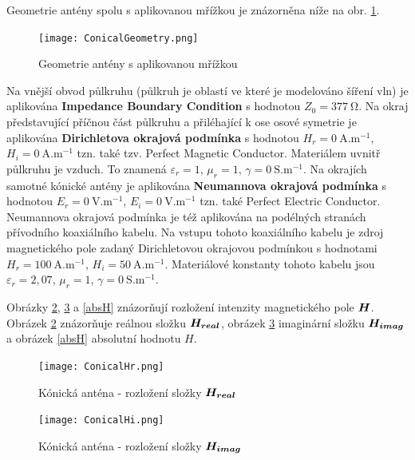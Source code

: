 \documentclass[12pt,a4paper,oneside]{article}
\numberwithin{equation}{section} %
\numberwithin{figure}{section} %
\numberwithin{table}{section} %
\renewcommand{\vec}[1]{\mbox{\boldmath$#1$}} %
\begin{document}
Geometrie antény spolu s aplikovanou mřížkou je znázorněna níže na obr. \ref{meshed}. 

\begin{figure}
\begin{center}
\texttt{[image: ConicalGeometry.png]} 
\caption{Geometrie antény s aplikovanou mřížkou} 
\label{meshed}
\end{center}
\end{figure}

Na vnější obvod půlkruhu (půlkruh je oblastí ve které je modelováno šíření vln) je aplikována \textbf{Impedance Boundary Condition} s hodnotou $Z_0 = 377 ~ \mathrm{\Omega}$. Na okraj představující příčnou část půlkruhu a přiléhající k ose osové symetrie je aplikována \textbf{Dirichletova okrajová podmínka} s hodnotou $H_r = 0 ~ \mathrm{A.m^{-1}}$, $H_i = 0 ~ \mathrm{A.m^{-1}}$ tzn. také tzv. Perfect Magnetic Conductor. Materiálem uvnitř půlkruhu je vzduch. To znamená $\varepsilon _r = 1$, $\mu _r = 1$, $\gamma = 0 ~ \mathrm{S.m^{-1}}$. Na okrajích samotné kónické antény je aplikována \textbf{Neumannova okrajová podmínka} s hodnotou $E_r = 0 ~ \mathrm{V.m^{-1}}$, $E_i = 0 ~ \mathrm{V.m^{-1}}$ tzn. také Perfect Electric Conductor. Neumannova okrajová podmínka je též aplikována na podélných stranách přívodního koaxiálního kabelu. Na vstupu tohoto koaxiálního kabelu je zdroj magnetického pole zadaný Dirichletovou okrajovou podmínkou s hodnotami $H_r = 100 ~ \mathrm{A.m^{-1}}$, $H_i = 50 ~ \mathrm{A.m^{-1}}$. Materiálové konstanty tohoto kabelu jsou $\varepsilon _r = 2,07$, $\mu _r = 1$, $\gamma = 0 ~ \mathrm{S.m^{-1}}$.

Obrázky \ref{Hreal}, \ref{Himag} a \ref{absH} znázorňují rozložení intenzity magnetického pole $\vec{H}$. Obrázek \ref{Hreal} znázorňuje reálnou složku $\vec{H _{real}}$, obrázek \ref{Himag} imaginární složku $\vec{H _{imag}}$ a obrázek \ref{absH} absolutní hodnotu $H$.

\begin{figure}
\begin{center}
\texttt{[image: ConicalHr.png]} 
\caption{Kónická anténa - rozložení složky $\vec{H _{real}}$} 
\label{Hreal}
\end{center}
\end{figure}

\begin{figure}
\begin{center}
\texttt{[image: ConicalHi.png]} 
\caption{Kónická anténa - rozložení složky $\vec{H _{imag}}$} 
\label{Himag}
\end{center}
\end{figure}
\end{document}

